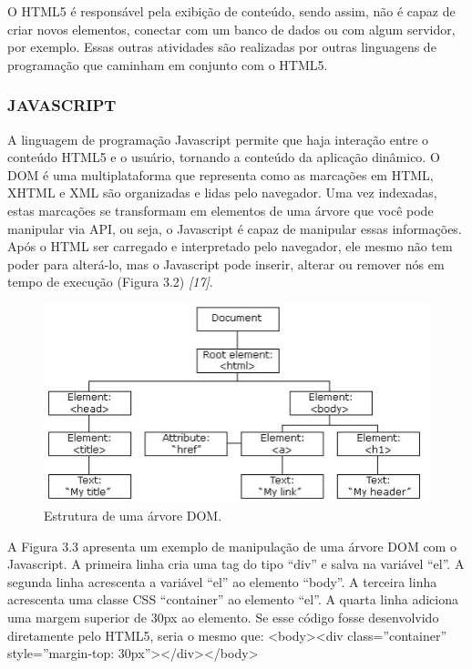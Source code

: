 \documentclass[
  12pt,				%
  openany,
  oneside,
  a4paper,			%
  english,			%
  brazil
]{article}
\numberwithin{figure}{section}
\numberwithin{table}{section}
\begin{document}
O HTML5 é responsável pela exibição de conteúdo, sendo assim, não é capaz de criar novos elementos, conectar com um banco de dados ou com algum servidor, por exemplo. Essas outras atividades são realizadas por outras linguagens de programação que caminham em conjunto com o HTML5.



\subsubsection{JAVASCRIPT}


A linguagem de programação Javascript permite que haja interação entre o conteúdo HTML5 e o usuário, tornando a conteúdo da aplicação dinâmico. O DOM é uma multiplataforma que representa como as marcações em HTML, XHTML e XML são organizadas e lidas pelo navegador. Uma vez indexadas, estas marcações se transformam em elementos de uma árvore que você pode manipular via API, ou seja, o Javascript é capaz de manipular essas informações. Após o HTML ser carregado e interpretado pelo navegador, ele mesmo não tem poder para alterá-lo, mas o Javascript pode inserir, alterar ou remover nós em tempo de execução (Figura 3.2) \textit{[17]}.

\begin{figure}[!htb]
\centering
\includegraphics[width=1\textwidth]{figura32}
\caption{Estrutura de uma árvore DOM.}
\end{figure}

A Figura 3.3 apresenta um exemplo de manipulação de uma árvore DOM com o Javascript. A primeira linha cria uma tag do tipo “div” e salva na variável “el”. A segunda linha acrescenta a variável “el” ao elemento “body”. A terceira linha acrescenta uma classe CSS
“container” ao elemento “el”. A quarta linha adiciona uma margem superior de 30px ao elemento.
Se esse código fosse desenvolvido diretamente pelo HTML5, seria o mesmo que:
<body><div class=”container” style=”margin-top: 30px”></div></body>
\end{document}
